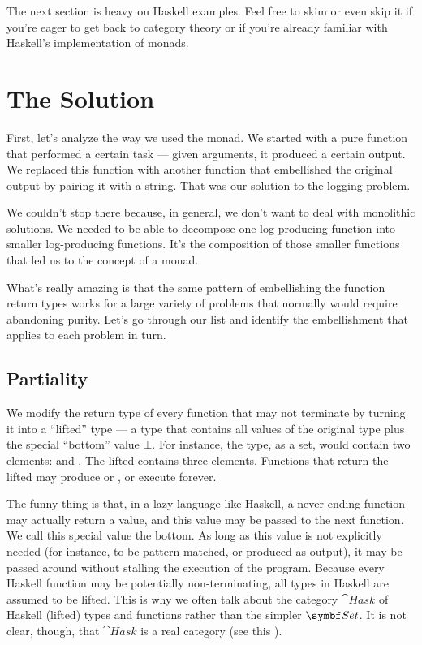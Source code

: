 The next section is heavy on Haskell examples. Feel free to skim or even
skip it if you're eager to get back to category theory or if you're
already familiar with Haskell's implementation of monads.

\section{The Solution}

First, let's analyze the way we used the  monad. We
started with a pure function that performed a certain task --- given
arguments, it produced a certain output. We replaced this function with
another function that embellished the original output by pairing it with
a string. That was our solution to the logging problem.

We couldn't stop there because, in general, we don't want to deal with
monolithic solutions. We needed to be able to decompose one
log-producing function into smaller log-producing functions. It's the
composition of those smaller functions that led us to the concept of a
monad.

What's really amazing is that the same pattern of embellishing the
function return types works for a large variety of problems that
normally would require abandoning purity. Let's go through our list and
identify the embellishment that applies to each problem in turn.

\subsection{Partiality}

We modify the return type of every function that may not terminate by
turning it into a ``lifted'' type --- a type that contains all values of
the original type plus the special ``bottom'' value $\bot$. For
instance, the  type, as a set, would contain two elements:
 and . The lifted  contains
three elements. Functions that return the lifted  may
produce  or , or execute forever.

The funny thing is that, in a lazy language like Haskell, a never-ending
function may actually return a value, and this value may be passed to
the next function. We call this special value the bottom. As long as
this value is not explicitly needed (for instance, to be pattern
matched, or produced as output), it may be passed around without
stalling the execution of the program. Because every Haskell function
may be potentially non-terminating, all types in Haskell are assumed to
be lifted. This is why we often talk about the category $\cat{Hask}$ of
Haskell (lifted) types and functions rather than the simpler
$\Set$. It is not clear, though, that $\cat{Hask}$ is a real
category (see this
).


